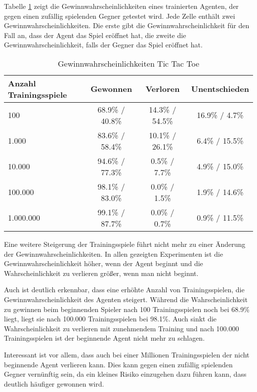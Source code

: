 \documentclass[11pt]{scrartcl}
\begin{document}
Tabelle \ref{tab:win_probability_tictactoe_begin} zeigt die Gewinnwahrscheinlichkeiten eines
trainierten Agenten, der gegen einen zufällig spielenden Gegner getestet wird. Jede Zelle
enthält zwei Gewinnwahrscheinlichkeiten. Die erste gibt die Gewinnwahrscheinlichkeit für
den Fall an, dass der Agent das Spiel eröffnet hat, die zweite die
Gewinnwahrscheinlichkeit, falls der Gegner das Spiel eröffnet hat.
\begin{table}[ht]
  \begin{center}
    \begin{tabular}{l | c | c | c}
      Anzahl Trainingsspiele & Gewonnen & Verloren & Unentschieden \\
      \hline
      100 & 68.9\% / 40.8\% & 14.3\% / 54.5\% & 16.9\% / 4.7\% \\
      1.000 & 83.6\% / 58.4\% & 10.1\% / 26.1\% & 6.4\% / 15.5\% \\
      10.000 & 94.6\% / 77.3\% & 0.5\% / 7.7\% & 4.9\% / 15.0\% \\
      100.000 & 98.1\% / 83.0\% & 0.0\% / 1.5\% & 1.9\% / 14.6\% \\
      1.000.000 & 99.1\% / 87.7\% & 0.0\% / 0.7\% & 0.9\% / 11.5\% \\
    \end{tabular}

    \caption[Gewinnwahrscheinlichkeiten Tic Tac Toe]{Gewinnwahrscheinlichkeiten Tic Tac
    Toe}
    \label{tab:win_probability_tictactoe_begin}
  \end{center}
\end{table}

\noindent
Eine weitere Steigerung der Trainingsspiele führt nicht mehr zu einer Änderung der
Gewinnwahrscheinlichkeiten. In allen gezeigten Experimenten ist die
Gewinnwahrscheinlichkeit höher, wenn der Agent beginnt und die Wahrscheinlichkeit zu
verlieren größer, wenn man nicht beginnt.

Auch ist deutlich erkennbar, dass eine erhöhte Anzahl von Trainingsspielen, die
Gewinnwahrscheinlichkeit des Agenten steigert. Während die Wahrscheinlichkeit zu gewinnen
beim beginnenden Spieler nach 100 Trainingsspielen noch bei 68.9\% liegt, liegt sie nach
100.000 Trainingsspielen bei 98.1\%. Auch sinkt die Wahrscheinlichkeit zu verlieren mit
zunehmendem Training und nach 100.000 Trainingsspielen ist der beginnende Agent nicht mehr
zu schlagen.

Interessant ist vor allem, dass auch bei einer Millionen Trainingsspielen der nicht
beginnende Agent verlieren kann. Dies kann gegen einen zufällig spielenden Gegner
vernünftig sein, da ein kleines Risiko einzugehen dazu führen kann, dass deutlich häufiger
gewonnen wird.
\end{document}
